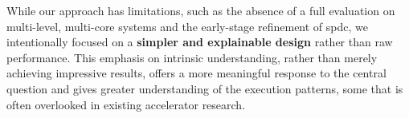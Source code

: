 While our approach has limitations, such as the absence of a full evaluation on multi-level, multi-core systems and the early-stage refinement of \acrlong{spdc}, we intentionally focused on a \textbf{simpler and explainable design} rather than raw performance.
This emphasis on intrinsic understanding, rather than merely achieving impressive results, offers a more meaningful response to the central question and gives greater understanding of the execution patterns, some that is often overlooked in existing accelerator research.






